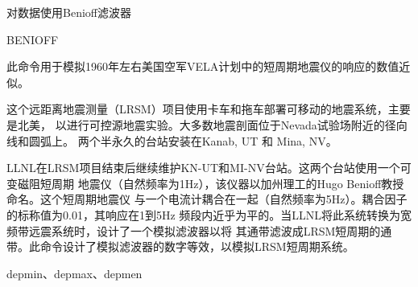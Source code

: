 \label{cmd:benioff}

对数据使用Benioff滤波器

\begin{SACSTX}
BENIOFF
\end{SACSTX}

此命令用于模拟1960年左右美国空军VELA计划中的短周期地震仪的响应的数值近似。

这个远距离地震测量（LRSM）项目使用卡车和拖车部署可移动的地震系统，主要是北美，
以进行可控源地震实验。大多数地震剖面位于Nevada试验场附近的径向线和圆弧上。
两个半永久的台站安装在Kanab, UT 和 Mina, NV。

LLNL在LRSM项目结束后继续维护KN-UT和MI-NV台站。这两个台站使用一个可变磁阻短周期
地震仪（自然频率为1Hz），该仪器以加州理工的Hugo Benioff教授命名。这个短周期地震仪
与一个电流计耦合在一起（自然频率为5Hz）。耦合因子的标称值为0.01，其响应在1到5Hz
频段内近乎为平的。当LLNL将此系统转换为宽频带远震系统时，设计了一个模拟滤波器以将
其通带滤波成LRSM短周期的通带。此命令设计了模拟滤波器的数字等效，以模拟LRSM短周期系统。

depmin、depmax、depmen
